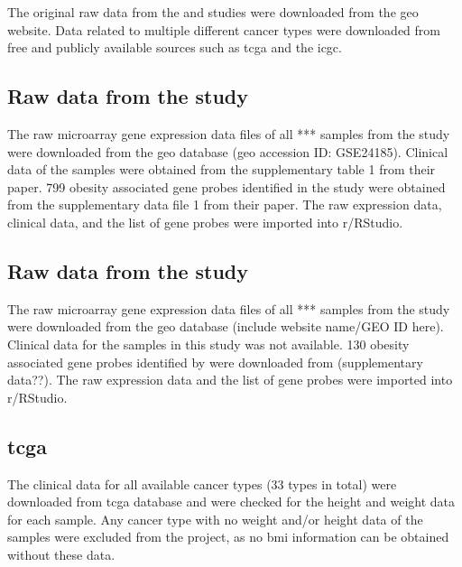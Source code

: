 The original raw data from the \citet{Creighton2012} and \citet{Fuentes-Mattei2014} studies were downloaded from the \gls{geo} website.
Data related to multiple different cancer types were downloaded from free and publicly available sources such as \gls{tcga} and the \gls{icgc}.

\subsection{Raw data from the \citet{Creighton2012} study}
\label{subsec:crrawdat}

The raw microarray gene expression data files of all *** samples from the \citet{Creighton2012} study were downloaded from the \gls{geo} database (\gls{geo} accession ID: GSE24185).
Clinical data of the samples were obtained from the supplementary table 1 from their paper.
799 obesity associated gene probes identified in the \citet{Creighton2012} study were obtained from the supplementary data file 1 from their paper.
The raw expression data, clinical data, and the list of gene probes were imported into \gls{r}/RStudio.

\subsection{Raw data from the \citet{Fuentes-Mattei2014} study}
\label{subsec:fmrawdat}

The raw microarray gene expression data files of all *** samples from the  \citet{Fuentes-Mattei2014} study were downloaded from the \gls{geo} database (include website name/GEO ID here).
Clinical data for the samples in this study was not available.
130 obesity associated gene probes identified by \citet{Fuentes-Mattei2014} were downloaded from (supplementary data??).
The raw expression data and the list of gene probes were imported into \gls{r}/RStudio.

\subsection{\gls{tcga}}
\label{subsec:tcga}

The clinical data for all available cancer types (33 types in total) were downloaded from \gls{tcga} database and were checked for the height and weight data for each sample.
Any cancer type with no weight and/or height data of the samples were excluded from the project, as no \gls{bmi} information can be obtained without these data.

